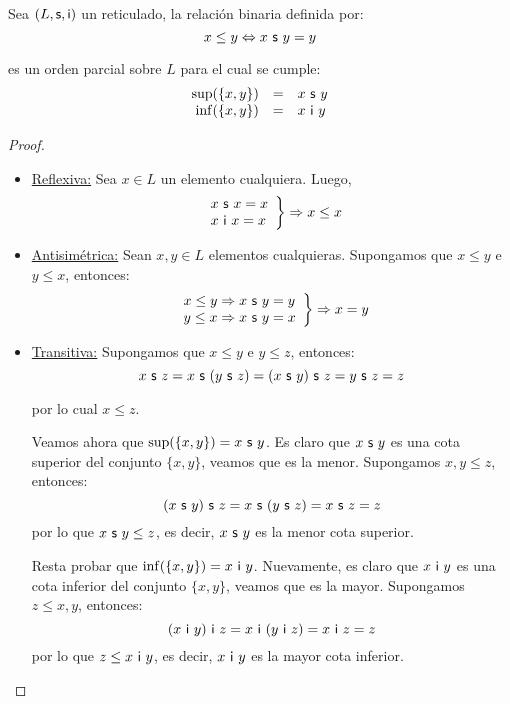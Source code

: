   \begin{theorem}
    \PN Sea $(L, \mathsf{s}, \mathsf{i})$ un reticulado, la relación binaria definida por:
    \[
      x \leq y \Leftrightarrow x \ \mathsf{s} \ y = y
    \]

    \PN es un orden parcial sobre $L$ para el cual se cumple:
    \[
      \begin{array}{rcl}
        \sup (\{x, y\}) &=& x \ \mathsf{s} \ y \\
        \inf (\{x, y\}) &=& x \ \mathsf{i} \ y
      \end{array}
    \]
  \end{theorem}
  \begin{proof}
    \begin{itemize}
      \item \underline{Reflexiva:} Sea $x \in L$ un elemento cualquiera. Luego,
        \begin{equation*}
          \left.
          \begin{array}{l}
            x \ \mathsf{s} \ x = x \\
            x \ \mathsf{i} \ x = x
          \end{array}
          \right \rbrace \Rightarrow x \leq x
        \end{equation*}

      \item \underline{Antisimétrica:} Sean $x, y \in L$ elementos cualquieras. Supongamos que $x \leq y$ e $y \leq x$,
        entonces:
        \begin{equation*}
          \left.
          \begin{array}{l}
            x \leq y \Rightarrow x \ \mathsf{s} \ y = y \\
            y \leq x \Rightarrow x \ \mathsf{s} \ y = x
          \end{array}
          \right \rbrace \Rightarrow x = y
        \end{equation*}

      \item \underline{Transitiva:} Supongamos que $x \leq y$ e $y \leq z$, entonces:
        \[
          x \ \mathsf{s} \ z = x \ \mathsf{s} \ (y \ \mathsf{s} \ z) = (x \ \mathsf{s} \ y) \ \mathsf{s} \ z = y \ \mathsf{s} \ z = z
        \]

        \PN por lo cual $x \leq z$.

        \PN Veamos ahora que $\sup(\{x, y\}) = x \ \mathsf{s} \ y$. Es claro que $x \ \mathsf{s} \ y$ es una cota superior del
        conjunto $\{x, y\}$, veamos que es la menor. Supongamos $x, y \leq z$, entonces:
        \[
          (x \ \mathsf{s} \ y) \ \mathsf{s} \ z = x \ \mathsf{s} \ (y \ \mathsf{s} \ z) = x \ \mathsf{s} \ z = z
        \]
        \PN por lo que $x\ \mathsf{s} \ y \leq z$, es decir, $x\ \mathsf{s} \ y$ es la menor cota superior.

        \PN Resta probar que $\inf(\{x, y\}) = x \ \mathsf{i} \ y$. Nuevamente, es claro que $x \ \mathsf{i} \ y$ es una cota inferior
        del conjunto $\{x, y\}$, veamos que es la mayor. Supongamos $z \leq x, y$, entonces:
        \[
          (x \ \mathsf{i} \ y) \ \mathsf{i} \ z = x \ \mathsf{i} \ (y \ \mathsf{i} \ z) = x \ \mathsf{i} \ z = z
        \]
        \PN por lo que $z \leq x\ \mathsf{i} \ y$, es decir, $x\ \mathsf{i} \ y$ es la mayor cota inferior.
    \end{itemize}
  \end{proof}

